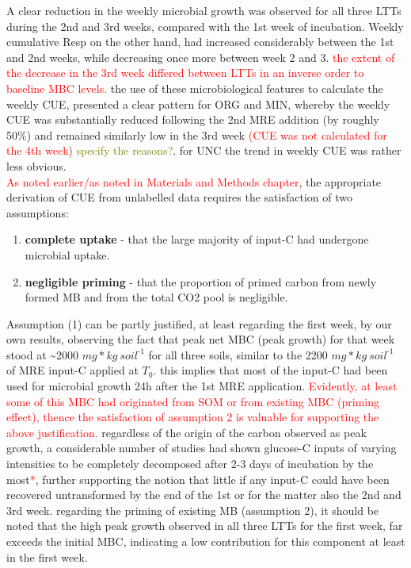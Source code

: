 \documentclass[12pt]{report}
\newcommand{\myRed}[1]{\textcolor{red}{#1}} %
\newcommand{\myGreen}[1]{\textcolor{olive}{#1}} %
\newlength{\SpaceAfterUnit}
\newcommand{\genericunit}{$ mg * kg\ soil^{\text{-}1}$ \hspace*{\SpaceAfterUnit}}
\begin{document}
			A clear reduction in the weekly microbial growth was observed for all three LTTs during the 2nd and 3rd weeks, compared with the 1st week of incubation.
			Weekly cumulative Resp on the other hand, had increased considerably between the 1st and 2nd weeks, while decreasing once more between week 2 and 3. \myRed{the extent of the decrease in the 3rd week differed between LTTs in an inverse order to  baseline MBC levels.}
			the use of these microbiological features to calculate the weekly CUE, presented a clear pattern for ORG and MIN, whereby the weekly CUE was substantially reduced following the 2nd MRE addition (by roughly 50\%) and remained similarly low in the 3rd week \myRed{(CUE was not calculated for the 4th week)} \myGreen{specify the reasons?}. for UNC the trend in weekly CUE was rather less obvious.\\ 
			\myRed{As noted earlier/as noted in Materials and Methods chapter}, the appropriate derivation of CUE from unlabelled data requires the satisfaction of two assumptions:
			\begin{enumerate}
				\item \label{item: complete_uptake}\textbf{complete uptake} - that the large majority of input-C had undergone microbial uptake.
				\item \label{item: negligible_priming}\textbf{negligible priming} - that the proportion of primed carbon from newly formed MB and from the total CO2 pool is negligible.
			\end{enumerate}
			Assumption (1) can be partly justified, at least regarding the first week, by  our own results,  observing the fact that peak net MBC (peak growth) for that week stood at \~{}2000 \genericunit for all three soils, similar to the 2200 \genericunit of MRE input-C applied at $ T_0 $. this implies that most of the  input-C had been used for microbial growth 24h after the 1st MRE application. \myRed{Evidently, at least some of this MBC had originated from SOM or from existing MBC (priming effect), thence the satisfaction of assumption 2 is valuable for supporting the above justification.} regardless of the origin of the carbon observed as peak growth, a considerable number of studies had shown glucose-C inputs of varying intensities to be completely decomposed after 2-3 days of incubation by the most\myRed{*}, further supporting the notion that little if any input-C could have been recovered untransformed by the end of the 1st or for the matter also the 2nd and 3rd week. 
		    regarding the priming of existing MB (assumption 2), it should be noted that the high peak growth observed in all three LTTs for the first week, far exceeds the initial MBC, indicating a low contribution for this component at least in the first week. 
\end{document}
